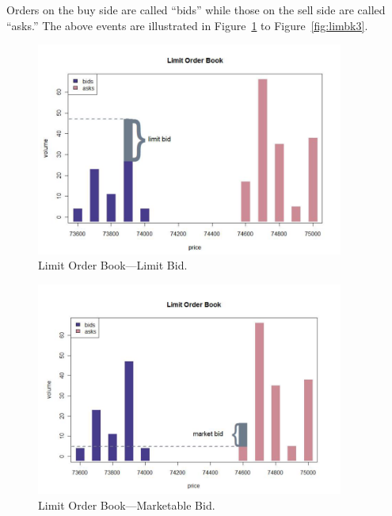 Orders on the buy side are called ``bids'' while those on the sell side are called ``asks.'' The above events are illustrated in Figure~\ref{fig:limbk1} to Figure~\ref{fig:limbk3}. \\
	\begin{figure}[!ht]
	   \centering
	   \includegraphics[width=0.9\textwidth]{chapters/chapter_trading_fund/figures/limitbk1.png} 
	   \caption{Limit Order Book---Limit Bid. \label{fig:limbk1}}
	\end{figure}
	\begin{figure}[!ht]
	   \centering
	   \includegraphics[width=0.9\textwidth]{chapters/chapter_trading_fund/figures/limitbk2.png} 
	   \caption{Limit Order Book---Marketable Bid. \label{fig:limbk2}}
	\end{figure}
	
